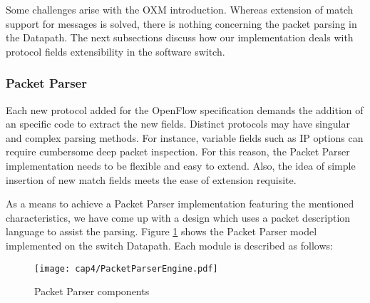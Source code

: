 Some challenges arise with the OXM introduction. Whereas extension of match support for messages is solved, there is nothing concerning the packet parsing in the Datapath. The next subsections discuss how our implementation deals with protocol fields extensibility in the software switch. 

    \subsubsection{Packet Parser}
    \label{pktparser}

    Each new protocol added for the OpenFlow specification demands the addition of an specific code to extract the new fields. Distinct protocols may have singular and complex parsing methods. For instance, variable fields such as IP options can require cumbersome deep packet inspection. For this reason, the Packet Parser implementation needs to be flexible and easy to extend. Also, the idea of simple insertion of new match fields meets the ease of extension requisite.    
    
    As a means to achieve a Packet Parser implementation featuring the mentioned characteristics, we have come up with a design which uses a packet description language to assist the parsing. Figure \ref{fig:netbee} shows the Packet Parser model implemented on the switch Datapath. Each module is described as follows:
    
    \begin{figure}[h]
    \centering
    \texttt{[image: cap4/PacketParserEngine.pdf]}
    \caption{Packet Parser components}
    \label{fig:netbee}
    \end{figure}
    
